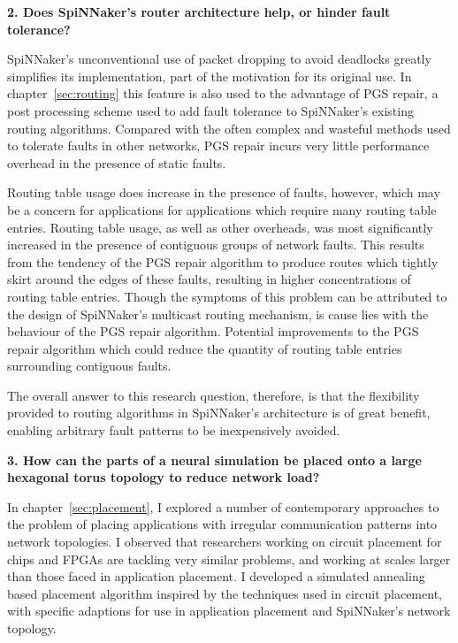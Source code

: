 		\vspace*{1.0em}
		\noindent%
		\textbf{2. Does SpiNNaker's router architecture help, or hinder fault
		tolerance?}
		
		SpiNNaker's unconventional use of packet dropping to avoid deadlocks
		greatly simplifies its implementation, part of the motivation for its
		original use. In chapter~\ref{sec:routing} this feature is also used to the
		advantage of PGS repair, a post processing scheme used to add fault
		tolerance to SpiNNaker's existing routing algorithms. Compared with the
		often complex and wasteful methods used to tolerate faults in other
		networks, PGS repair incurs very little performance overhead in the
		presence of static faults.
		
		Routing table usage does increase in the presence of faults, however, which
		may be a concern for applications for applications which require many
		routing table entries. Routing table usage, as well as other overheads, was
		most significantly increased in the presence of contiguous groups of
		network faults. This results from the tendency of the PGS repair algorithm
		to produce routes which tightly skirt around the edges of these faults,
		resulting in higher concentrations of routing table entries.  Though the
		symptoms of this problem can be attributed to the design of SpiNNaker's
		multicast routing mechanism, is cause lies with the behaviour of the PGS
		repair algorithm. Potential improvements to the PGS repair algorithm which
		could reduce the quantity of routing table entries surrounding contiguous
		faults.
		
		The overall answer to this research question, therefore, is that the
		flexibility provided to routing algorithms in SpiNNaker's architecture is
		of great benefit, enabling arbitrary fault patterns to be inexpensively
		avoided.
		
		\vspace*{1.0em}
		\noindent%
		\textbf{3. How can the parts of a neural simulation be placed onto a large
		hexagonal torus topology to reduce network load?}
		
		In chapter~\ref{sec:placement}, I explored a number of contemporary
		approaches to the problem of placing applications with irregular
		communication patterns into network topologies. I observed that researchers
		working on circuit placement for chips and FPGAs are tackling very similar
		problems, and working at scales larger than those faced in application
		placement. I developed a simulated annealing based placement algorithm
		inspired by the techniques used in circuit placement, with specific
		adaptions for use in application placement and SpiNNaker's network
		topology.
		
